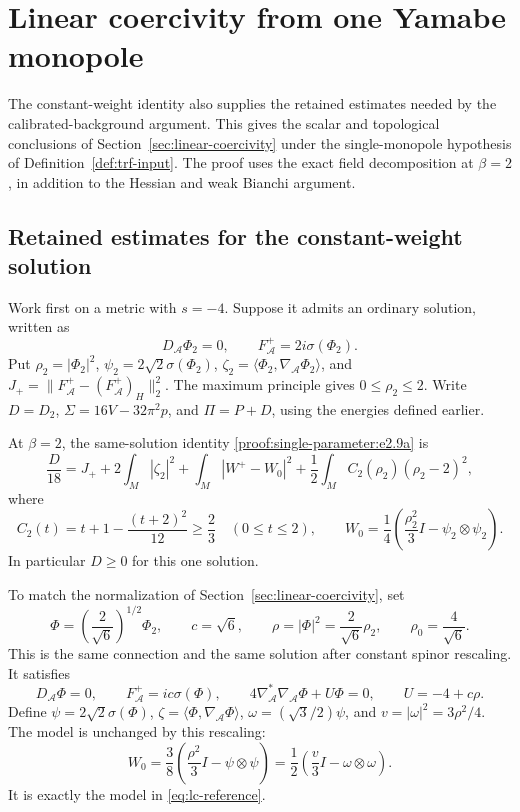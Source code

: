 \section{Linear coercivity from one Yamabe monopole}
\label{sec:single-solution-coercivity}

The constant-weight identity also supplies the retained estimates
needed by the calibrated-background argument.  This gives the scalar
and topological conclusions of Section~\ref{sec:linear-coercivity}
under the single-monopole hypothesis of
Definition~\ref{def:trf-input}.  The proof uses the exact field
decomposition at $\beta=2$, in addition to the Hessian and weak
Bianchi argument.

\subsection{Retained estimates for the constant-weight solution}

Work first on a metric with $s=-4$.  Suppose it admits an ordinary
solution, written as
\[
 D_{\mathcal A}\Phi_2=0,\qquad
 F_{\mathcal A}^+=2i\sigma(\Phi_2).
\]
Put $\rho_2=|\Phi_2|^2$,
$\psi_2=2\sqrt2\sigma(\Phi_2)$,
$\zeta_2=\langle\Phi_2,\nabla_{\mathcal A}\Phi_2\rangle$, and
$J_+=\|F_{\mathcal A}^+-(F_{\mathcal A}^+)_H\|_2^2$.
The maximum principle gives $0\le\rho_2\le2$.
Write $D=D_2$, $\Sigma=16V-32\pi^2p$, and
$\Pi=P+D$, using the energies defined earlier.

At $\beta=2$, the same-solution identity
\eqref{proof:single-parameter:e2.9a} is
\begin{equation}\label{eq:ssc-exact-decomposition}
 \frac D{18}=J_++2\int_M|\zeta_2|^2
       +\int_M|W^+-W_0|^2
       +\frac12\int_M C_2(\rho_2)(\rho_2-2)^2,
\end{equation}
where
\[
 C_2(t)=t+1-\frac{(t+2)^2}{12}\ge\frac23
       \quad(0\le t\le2),\qquad
 W_0=\frac14\left(\frac{\rho_2^2}{3}I-
                                    \psi_2\otimes\psi_2\right).
\]
In particular $D\ge0$ for this one solution.

To match the normalization of Section~\ref{sec:linear-coercivity}, set
\begin{equation}\label{eq:ssc-spinor-rescaling}
 \Phi=\left(\frac2{\sqrt6}\right)^{1/2}\Phi_2,
 \qquad c=\sqrt6,
 \qquad \rho=|\Phi|^2=\frac2{\sqrt6}\rho_2,
 \qquad \rho_0=\frac4{\sqrt6}.
\end{equation}
This is the same connection and the same solution after constant
spinor rescaling.  It satisfies
\[
 D_{\mathcal A}\Phi=0,\qquad
 F_{\mathcal A}^+=ic\sigma(\Phi),\qquad
 4\nabla_{\mathcal A}^*\nabla_{\mathcal A}\Phi+U\Phi=0,
 \qquad U=-4+c\rho.
\]
Define $\psi=2\sqrt2\sigma(\Phi)$,
$\zeta=\langle\Phi,\nabla_{\mathcal A}\Phi\rangle$,
$\omega=(\sqrt3/2)\psi$, and $v=|\omega|^2=3\rho^2/4$.
The model is unchanged by this rescaling:
\[
 W_0=\frac38\left(\frac{\rho^2}{3}I-\psi\otimes\psi\right)
     =\frac12\left(\frac v3I-\omega\otimes\omega\right).
\]
It is exactly the model in \eqref{eq:lc-reference}.

